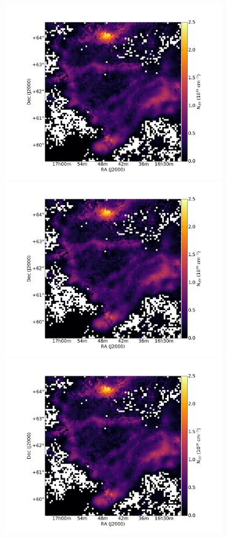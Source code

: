 \documentclass[traditabstract]{aa}
\begin{document}



\begin{figure}[h]
  \centering
  \includegraphics[page=1,height=7.5cm,trim=110 35 105 75,clip=true]{Figures/Phases_GHIGLS/GHIGLS_NHI.pdf}
  \hspace{5mm}
  \includegraphics[page=4,height=7.5cm,trim=110 35 105 75,clip=true]{Figures/Phases_GHIGLS/GHIGLS_NHI.pdf} \\
  \vspace{5mm}
  \includegraphics[page=2,height=7.5cm,trim=110 35 105 75,clip=true]{Figures/Phases_GHIGLS/GHIGLS_NHI.pdf}

\end{figure}
\end{document}
